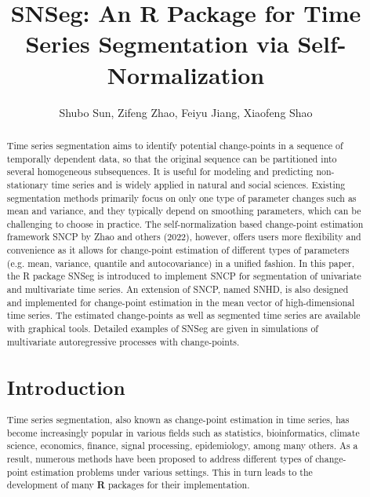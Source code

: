 \title{SNSeg: An R Package for  Time Series Segmentation via Self-Normalization}
\author{Shubo Sun, Zifeng Zhao, Feiyu Jiang, Xiaofeng Shao}

\maketitle

\begin{abstract}
	Time series segmentation aims to identify potential change-points in a sequence of temporally dependent data, so that the original sequence can be partitioned into several homogeneous subsequences. It is useful for modeling and predicting non-stationary time series and is widely applied in natural and social sciences. Existing segmentation methods primarily focus on only one type of parameter changes such as mean and variance, and they typically depend on smoothing parameters, which can be challenging to choose in practice. The self-normalization based change-point estimation framework SNCP by Zhao and others (2022), however, offers users more flexibility and convenience as it  allows for change-point estimation of different types of parameters (e.g. mean, variance, quantile and autocovariance) in a unified fashion.  In this paper, the R package SNSeg is introduced  to implement  SNCP for segmentation of univariate and multivariate time series.  An extension of SNCP, named SNHD, is also designed and implemented for change-point estimation in the mean vector of high-dimensional time series. The estimated change-points as well as segmented time series are available with graphical tools.  Detailed examples of SNSeg are given in simulations of multivariate autoregressive processes with change-points.



\section[Intro]{Introduction}\label{sec:intro}
Time series segmentation, also known as change-point estimation in time series, has become increasingly popular in various fields such as statistics, bioinformatics, climate science, economics, finance, signal processing, epidemiology, among many others. As a result, numerous methods have been proposed to address different types of change-point estimation problems under various settings. This in turn  leads to the development of many \textbf{R} packages for their implementation. 



\end{abstract}
